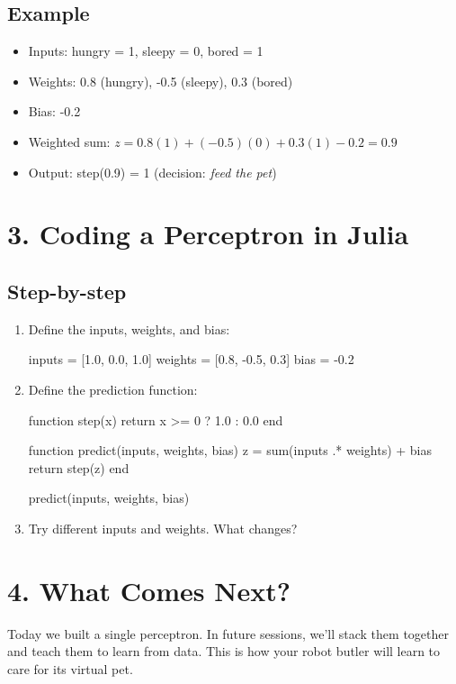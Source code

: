 \documentclass{book}
\begin{document}
\subsection*{Example}
\begin{itemize}
  \item Inputs: hungry = 1, sleepy = 0, bored = 1
  \item Weights: 0.8 (hungry), -0.5 (sleepy), 0.3 (bored)
  \item Bias: -0.2
  \item Weighted sum: $z = 0.8(1) + (-0.5)(0) + 0.3(1) - 0.2 = 0.9$
  \item Output: step(0.9) = 1 \quad (decision: \textit{feed the pet})
\end{itemize}

\section*{3. Coding a Perceptron in Julia}
\subsection*{Step-by-step}
\begin{enumerate}
  \item Define the inputs, weights, and bias:
\begin{julia}
inputs = [1.0, 0.0, 1.0]
weights = [0.8, -0.5, 0.3]
bias = -0.2
\end{julia}

  \item Define the prediction function:
\begin{julia}
function step(x)
    return x >= 0 ? 1.0 : 0.0
end

function predict(inputs, weights, bias)
    z = sum(inputs .* weights) + bias
    return step(z)
end

predict(inputs, weights, bias)
\end{julia}

  \item Try different inputs and weights. What changes?
\end{enumerate}

\section*{4. What Comes Next?}
Today we built a single perceptron. In future sessions, we'll stack them together and teach them to learn from data. This is how your robot butler will learn to care for its virtual pet.
\end{document}
